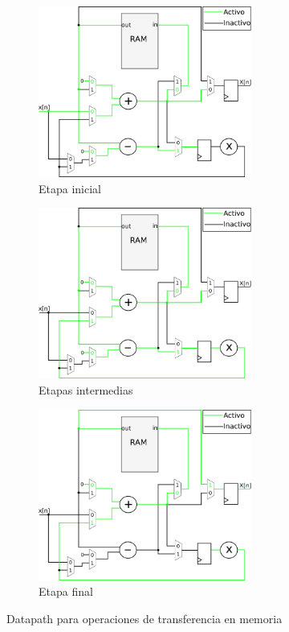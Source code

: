 \begin{figure}[htb!]
        \centering
        \begin{subfigure}{\columnwidth}\centering
        \includegraphics[width=7cm]{./figures/datapath_mem1.png}
        \caption{Etapa inicial}
        \end{subfigure}
        \begin{subfigure}{\columnwidth}\centering
        \includegraphics[width=7cm]{./figures/datapath_memint.png}
        \caption{Etapas intermedias}
        \end{subfigure}
        \begin{subfigure}{\columnwidth}\centering
        \includegraphics[width=7cm]{./figures/datapath_memf.png}
        \caption{Etapa final}
        \end{subfigure}
        \caption{Datapath para operaciones de transferencia en memoria}
        \label{fig:datapathMem}
\end{figure}

